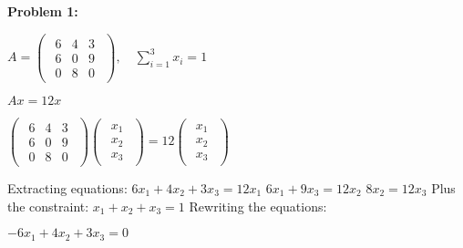 \textbf{Problem 1:}

\singlespacing

\begin{math}
    A = \begin{pmatrix}
        \begin{array}{ccc}
            6 & 4 & 3 \\
            6 & 0 & 9 \\
            0 & 8 & 0
        \end{array}
    \end{pmatrix},\quad
    \sum_{i=1}^{3}{x_i} = 1
\end{math}

\singlespacing
\singlespacing

$Ax = 12x$

\singlespacing
\singlespacing

\begin{math}
    \begin{pmatrix}
        \begin{array}{ccc}
            6 & 4 & 3 \\
            6 & 0 & 9 \\
            0 & 8 & 0
        \end{array}
    \end{pmatrix}
    \begin{pmatrix}
        \begin{array}{c}
            x_1 \\
            x_2 \\
            x_3
        \end{array}
    \end{pmatrix} = 12
    \begin{pmatrix}
        \begin{array}{c}
            x_1 \\
            x_2 \\
            x_3
        \end{array}
    \end{pmatrix}
\end{math}

\singlespacing
\singlespacing
Extracting equations:
\singlespacing
$6x_1 + 4x_2 + 3x_3 = 12x_1$
\singlespacing
$6x_1 + 9x_3 = 12x_2$
\singlespacing
$8x_2 = 12x_3$
\singlespacing
\singlespacing
Plus the constraint:
\singlespacing
$x_1 + x_2 + x_3 = 1$
\singlespacing
\singlespacing
Rewriting the equations:
\singlespacing

$-6x_1 + 4x_2 + 3x_3 = 0$
\singlespacing

